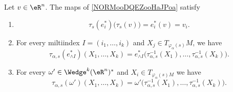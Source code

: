 \begin{lemma}		\label{LEMooMEZCooGXpOOa}
	Let \( v\in \eR^n\). The maps of \ref{NORMooDQEZooHaJPoa} satisfy
	\begin{enumerate}
		\item		\label{ITEMooZSFDooAuUnPd}
		      \begin{equation}
			      \tau_s(e^*_i)\big( \tau_s(v) \big)=e_i^*(v)=v_i.
		      \end{equation}
		\item		\label{ITEMooSVEFooBKhHnc}
		      For every miltiindex \( I=(i_1,\ldots,i_k)\) and \( X_j\in T_{\varphi_{\alpha}(s)}M\), we have
		      \begin{equation}
			      \tau_{\alpha,s}(e^*_{\wedge I})(X_1,\ldots,X_k)=e^*_{\wedge I}\big( \tau_{\alpha,s}^{-1}(X_1),\ldots,\tau_{\alpha,s}^{-1}(X_k) \big).
		      \end{equation}
		      \item\label{ITEMooQUZCooGcJrLe}
		      For every \( \omega'\in \Wedge^k(\eR^n)^*\) and \( X_i\in T_{\varphi_{\alpha}(s)M}\) we have
		      \begin{equation}
			      \tau_{\alpha,s}(\omega')(X_1,\ldots,X_k)=\omega'\big( \tau_{\alpha,s}^{-1}(X_1),\ldots,\tau_{\alpha,s}^{-1}(X_k) \big).
		      \end{equation}
	\end{enumerate}
\end{lemma}

